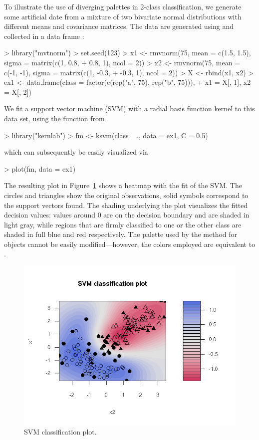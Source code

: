 \documentclass{Z}
\begin{document}
To illustrate the use of diverging palettes in 2-class classification, we generate
some artificial date from a mixture of two bivariate normal distributions with
different means and covariance matrices. The data are generated using 
and collected in a data frame :
\begin{Schunk}
\begin{Sinput}
> library("mvtnorm")
> set.seed(123)
> x1 <- rmvnorm(75, mean = c(1.5, 1.5), sigma = matrix(c(1, 0.8, 
+     0.8, 1), ncol = 2))
> x2 <- rmvnorm(75, mean = c(-1, -1), sigma = matrix(c(1, -0.3, 
+     -0.3, 1), ncol = 2))
> X <- rbind(x1, x2)
> ex1 <- data.frame(class = factor(c(rep("a", 75), rep("b", 75))), 
+     x1 = X[, 1], x2 = X[, 2])
\end{Sinput}
\end{Schunk}
We fit a support vector machine (SVM) with a radial basis function kernel to this data
set, using the function  from 
\begin{Schunk}
\begin{Sinput}
> library("kernlab")
> fm <- ksvm(class ~ ., data = ex1, C = 0.5)
\end{Sinput}
\end{Schunk}
which can subsequently be easily visualized via
\begin{Schunk}
\begin{Sinput}
> plot(fm, data = ex1)
\end{Sinput}
\end{Schunk}
The resulting plot in Figure~\ref{fig:class} shows a heatmap with the fit of 
the SVM. The circles and triangles show the original observations, solid symbols correspond to
the support vectors found. The shading underlying the plot visualizes the fitted decision
values: values around 0 are on the decision boundary and are shaded in light gray, while
regions that are firmly classified to one or the other class are shaded in full blue and
red respectively. The palette used by the  method for  objects
cannot be easily modified---however, the colors employed are equivalent to
.

\begin{figure}[p]
\begin{center}
\includegraphics{class}
\caption{\label{fig:class} SVM classification plot.}
\end{center}
\end{figure}




\end{document}
